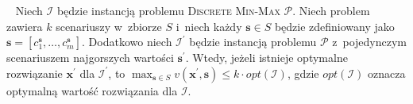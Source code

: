 \begin{theorem}\label{th:minmaxworst}~\cite[$430$]{minmaxSurvey}
	Niech $\mathcal{I}$ będzie instancją problemu \textsc{Discrete Min-Max $\mathcal{P}$}.
	Niech problem zawiera $k$ scenariuszy w~zbiorze $S$ i~niech każdy $\textbf{s} \in S$ będzie zdefiniowany jako $\textbf{s} = \left[ c^{\textbf{s}}_{1}, \dots, c^{\textbf{s}}_{m} \right]$.
	Dodatkowo niech $\mathcal{I^{\prime}}$ będzie instancją problemu $\mathcal{P}$ z~pojedynczym scenariuszem najgorszych wartości $\textbf{s}^{\prime}$.
	Wtedy, jeżeli istnieje optymalne rozwiązanie $\textbf{x}^{\prime}$ dla $\mathcal{I}^{\prime}$, to $\max_{\textbf{s} \in S} v \left( \textbf{x}^{\prime}, \textbf{s} \right) \leqslant k \cdot opt \left( \mathcal{I} \right)$, gdzie $opt \left( \mathcal{I} \right)$ oznacza optymalną wartość rozwiązania dla $\mathcal{I}$.
\end{theorem}


